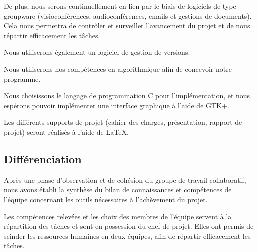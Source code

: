 \documentclass[a4paper, 12pt]{article}
\begin{document}
\par De plus, nous serons continuellement en lien par le biais de logiciels de type groupware (visioconférences, audioconférences, emails et gestions de documents). Cela nous permettra de contrôler et surveiller l'avancement du projet et de nous répartir efficacement les tâches.

\par Nous utiliserons également un logiciel de gestion de versions.

\par Nous utiliserons nos compétences en algorithmique afin de concevoir notre programme.

\par Nous choisissons le langage de programmation C pour l'implémentation, et nous espérons pouvoir implémenter une interface graphique à l'aide de GTK+.

\par Les différents supports de projet (cahier des charges, présentation, rapport de projet) seront réalisés à l'aide de \LaTeX.

\subsection{Différenciation}

\par Après une phase d'observation et de cohésion du groupe de travail collaboratif, nous avons établi la synthèse du bilan de connaissances et compétences de l'équipe concernant les outils nécessaires à l'achèvement du projet.

\par Les compétences relevées et les choix des membres de l'équipe servent à la répartition des tâches et sont en possession du chef de projet. Elles ont permis de scinder les ressources humaines en deux équipes, afin de répartir efficacement les tâches.

\noindent
\begin{minipage}{\linewidth}
\label{bilan}
\end{minipage}
\end{document}
